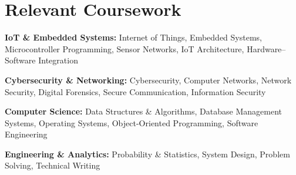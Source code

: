 \documentclass[a4paper,11pt]{article}
\begin{document}
\vspace{-10pt}


\section{Relevant Coursework}

\begin{itemize}[leftmargin=0in, label={}]

\small{

\item{
\textbf{IoT \& Embedded Systems:} Internet of Things, Embedded Systems, Microcontroller Programming, Sensor Networks, IoT Architecture, Hardware--Software Integration
}

\item{
\textbf{Cybersecurity \& Networking:} Cybersecurity, Computer Networks, Network Security, Digital Forensics, Secure Communication, Information Security
}

\item{
\textbf{Computer Science:} Data Structures \& Algorithms, Database Management Systems, Operating Systems, Object-Oriented Programming, Software Engineering
}

\item{
\textbf{Engineering \& Analytics:} Probability \& Statistics, System Design, Problem Solving, Technical Writing
}

}

\end{itemize}

\vspace{-10pt}
\end{document}
